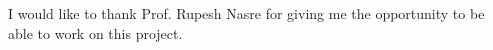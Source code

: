 \acknowledgements

I would like to thank Prof. Rupesh Nasre for giving me the opportunity to be able to work on this project.